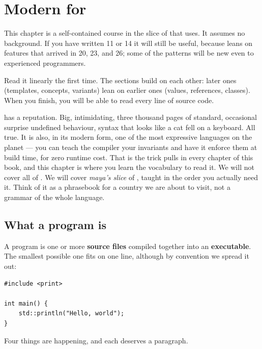 \chapter{Modern \cpp{} for \maya{}}
\label{ch:cpp}

This chapter is a self-contained course in the slice of \cpp{} that
\maya{} uses. It assumes no \cpp{} background. If you have written
\cpp{}11 or \cpp{}14 it will still be useful, because \maya{} leans
on features that arrived in \cpp{}20, \cpp{}23, and \cpp{}26; some of
the patterns will be new even to experienced \cpp{} programmers.

Read it linearly the first time. The sections build on each other:
later ones (templates, concepts, variants) lean on earlier ones
(values, references, classes). When you finish, you will be able to
read every line of \maya{} source code.

\begin{aside}
\cpp{} has a reputation. Big, intimidating, three thousand pages of
standard, occasional surprise undefined behaviour, syntax that looks
like a cat fell on a keyboard. All true. It is also, in its modern
form, one of the most expressive languages on the planet --- you can
teach the compiler your invariants and have it enforce them at build
time, for zero runtime cost. That is the trick \maya{} pulls in
every chapter of this book, and this chapter is where you learn the
vocabulary to read it. We will not cover all of \cpp{}. We will
cover \emph{maya's slice} of \cpp{}, taught in the order you actually
need it. Think of it as a phrasebook for a country we are about to
visit, not a grammar of the whole language.
\end{aside}


\section{What a \cpp{} program is}
\label{sec:cpp:program}

A \cpp{} program is one or more \textbf{source files} compiled
together into an \textbf{executable}. The smallest possible one fits
on one line, although by convention we spread it out:

\begin{lstlisting}
#include <print>

int main() {
    std::println("Hello, world");
}
\end{lstlisting}

Four things are happening, and each deserves a paragraph.


